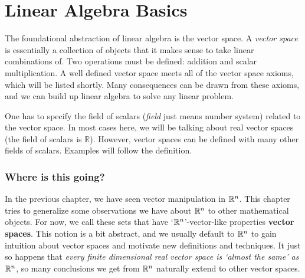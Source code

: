 \chapter{Linear Algebra Basics}

\setcounter{exercisecounter}{0}

\setcounter{thmcounter}{1}
    The foundational abstraction of linear algebra is the vector space. A \textit{vector space} is essentially a collection of objects that it
makes sense to take linear combinations of. Two operations must be defined: addition and scalar multiplication. A well defined
vector space meets all of the vector space axioms, which will be listed shortly. Many consequences can be drawn from these axioms,
and we can build up linear algebra to solve any linear problem.

\begin{remark}
	One has to specify the field of scalars (\textit{field} just means number system) related to the vector space. In most cases
here, we will be talking about real vector spaces (the field of scalars is $\mathbb{R}$). However, vector spaces can be defined with
many other fields of scalars. Examples will follow the definition.
\end{remark}
\subsection*{Where is this going?}
In the previous chapter, we have seen vector manipulation in $\mathbb{R}^n$. This chapter tries to generalize some observations we have about $\mathbb{R}^n$ to other mathematical objects.
For now, we call these sets that have `$\mathbb{R}^n$'-vector-like properties \textbf{vector spaces}. This notion is a bit abstract, and we usually default to $\mathbb{R}^n$
to gain intuition about vector spaces and motivate new definitions and techniques. It just so happens that \textit{every finite dimensional real vector space is `almost the same' as $\mathbb{R}^n$},
so many conclusions we get from $\mathbb{R}^n$ naturally extend to other vector spaces.

